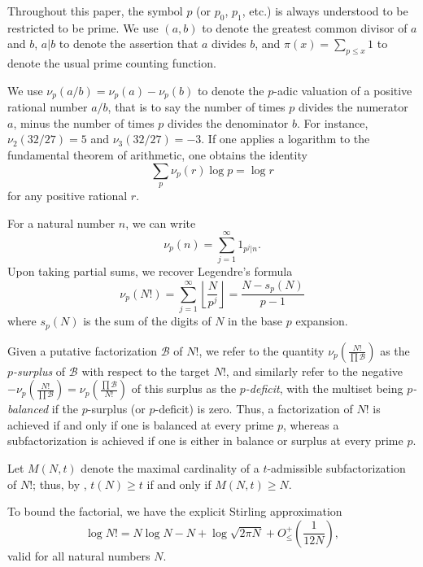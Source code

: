 \documentclass[12pt,a4paper,reqno]{amsart}
\numberwithin{equation}{section}
\theoremstyle{plain}
\theoremstyle{definition}
\newcommand\tuple{{\mathcal B}}
\begin{document}
Throughout this paper, the symbol $p$ (or $p_0$, $p_1$, etc.) is always understood to be restricted to be prime.  
We use $(a,b)$ to denote the greatest common divisor of $a$ and $b$, $a|b$ to denote the assertion that $a$ divides $b$, and $\pi(x) = \sum_{p \leq x} 1$ to denote the usual prime counting function.

We use $\nu_p(a/b) = \nu_p(a)-\nu_p(b)$ to denote the $p$-adic valuation of a positive rational number $a/b$, that is to say the number of times $p$ divides the numerator $a$, minus the number of times $p$ divides the denominator $b$.  For instance, $\nu_2(32/27)=5$ and $\nu_3(32/27)=-3$.
If one applies a logarithm to the fundamental theorem of arithmetic, one obtains the identity
\begin{equation}\label{ftoa}
  \sum_p \nu_p(r) \log p = \log r
\end{equation}
for any positive rational $r$.  

For a natural number $n$, we can write
\begin{equation}\label{nup-form} 
  \nu_p(n) = \sum_{j=1}^\infty 1_{p^j|n}.
\end{equation}
Upon taking partial sums, we recover Legendre's formula
\begin{equation}\label{legendre}
  \nu_p(N!) = \sum_{j=1}^\infty \left\lfloor \frac{N}{p^j} \right\rfloor = \frac{N - s_p(N)}{p-1}
\end{equation}
where $s_p(N)$ is the sum of the digits of $N$ in the base $p$ expansion.

Given a putative factorization $\tuple$ of $N!$,  
we refer to the quantity $\nu_p\left( \frac{N!}{\prod \tuple} \right)$ as the \emph{$p$-surplus} of $\tuple$ with respect to the target $N!$, and similarly refer to the negative $-\nu_p\left( \frac{N!}{\prod \tuple} \right) = \nu_p\left( \frac{\prod \tuple}{N!} \right)$ of this surplus as the \emph{$p$-deficit}, with the multiset being \emph{$p$-balanced} if the $p$-surplus (or $p$-deficit) is zero.  Thus, a factorization of $N!$ is achieved if and only if one is balanced at every prime $p$, whereas a subfactorization is achieved if one is either in balance or surplus at every prime $p$.

Let $M(N,t)$ denote the maximal cardinality of a $t$-admissible subfactorization of $N!$; thus, by , $t(N) \geq t$ if and only if $M(N,t) \geq N$. 

To bound the factorial, we have the explicit Stirling approximation \cite{robbins}
\begin{equation}\label{stirling}
\log N! = N \log N - N + \log \sqrt{2\pi N} + O_\leq^+\left(\frac{1}{12N}\right),
\end{equation}
valid for all natural numbers $N$. 
\end{document}
